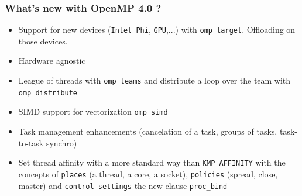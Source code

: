 \begin{frame}[fragile]
  \frametitle{What's new with OpenMP 4.0 ?}

  \begin{itemize}
  \item{ Support for new devices (\verb+Intel Phi+, \verb+GPU+,...) with \verb+omp target+. Offloading on those devices. }
  \item{ Hardware agnostic}
  \item{ League of threads with \verb+omp teams+ and distribute a loop over the team with \verb+omp distribute+ }
  \item{ SIMD support for vectorization \verb+omp simd+ }
  \item{ Task management enhancements (cancelation of a task, groups of tasks, task-to-task synchro)}
  \item{ Set thread affinity with a more standard way than \verb+KMP_AFFINITY+ with the concepts of \verb+places+ (a thread, a core, a socket), \verb+policies+ (spread, close, master) and \verb+control settings+ the new clause \verb+proc_bind+}
  \end{itemize}
\end{frame}


